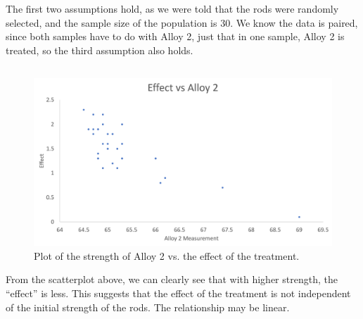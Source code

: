 \documentclass[letterpaper]{article}
\begin{document}
The first two assumptions hold, as we were told that the rods were randomly
selected, and the sample size of the population is 30. We know the data is
paired, since both samples have to do with Alloy 2, just that in one sample,
Alloy 2 is treated, so the third assumption also holds.

\subsection{}%
%

\begin{figure}[H]
 \centering
 \includegraphics[width=\textwidth]{q6.png}
 \caption{Plot of the strength of Alloy 2 vs. the effect of the treatment.}
 \label{q6}
\end{figure}

From the scatterplot above, we can clearly see that with higher strength, the
``effect'' is less. This suggests that the effect of the treatment is not
independent of the initial strength of the rods. The relationship may be linear.
\end{document}
